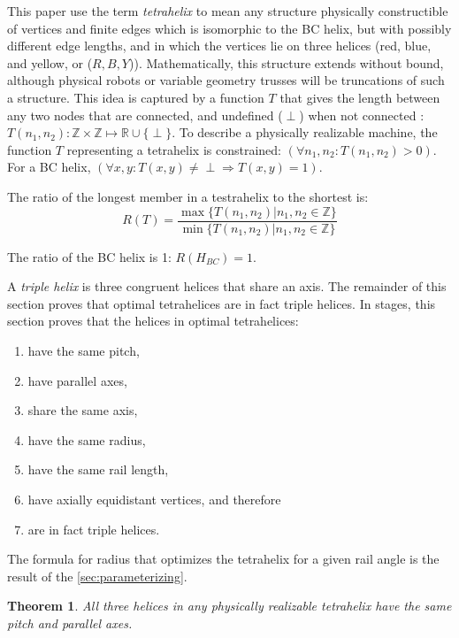 \documentclass[10pt,final]{journals-1.0/asme2ej}
\newtheorem{theorem}{Theorem}
\begin{document}
This paper use the term \emph{tetrahelix} to mean any structure physically constructible of
vertices and finite edges which is isomorphic to the BC helix, but with possibly different edge lengths,
and in which the
vertices lie on three helices (red, blue, and yellow, or ($R,B,Y$)). 
Mathematically, this structure extends
without bound, although physical robots or variable geometry trusses will
be truncations of such a structure.
This idea is captured by a function $T$ that gives the length between any
two nodes that are connected, and undefined ($\perp$) when not connected :
$T(n_1,n_2) : \mathbb{Z} \times \mathbb{Z} \mapsto \mathbb{R} \cup \{\perp\} $.
To describe a physically realizable machine, the function $T$ representing a tetrahelix
is constrained:
$(\forall n_1,n_2 : T(n_1,n_2) > 0)$.
For a BC helix, $(\forall x,y : T(x,y) \neq \perp \Rightarrow T(x,y) = 1)$.

The ratio of the longest member in a testrahelix to the shortest is:
\begin{equation}
R(T) = \frac{\max \{T(n_1,n_2) | n_1,n_2 \in \mathbb{Z} \}}{\min \{T(n_1,n_2) | n_1,n_2 \in \mathbb{Z} \}}
\label{eq:optdef}
\end{equation}

 The ratio of the BC helix is 1: $ R(H_{BC}) = 1$.

A \emph{triple helix} is three congruent helices that share an axis. The remainder of this
section proves that
optimal tetrahelices are in fact triple helices.
In stages, this section proves that the helices in optimal tetrahelices:
\begin{enumerate}
\item have the same pitch,
\item have parallel axes,
\item share the same axis,
\item have the same radius,
  \item have the same rail length,
  \item have axially equidistant vertices, and therefore
  \item are in fact triple helices.
\end{enumerate}
The formula for radius that optimizes the tetrahelix for a given rail angle
is the result of the \cref{sec:parameterizing}.

\begin{theorem}
  All three helices in any physically realizable tetrahelix have the same pitch and parallel axes.
  \label{thm:pitchandparallel}
\end{theorem}
\end{document}
